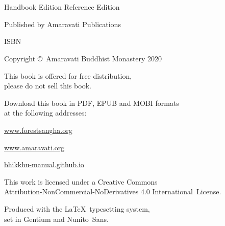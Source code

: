 \cleartoverso
\thispagestyle{empty}

{%

\ifhandbookedition
\fontsize{9}{10}\selectfont
\else
\fontsize{9}{11}\selectfont
\fi
\centering
\setlength{\parindent}{0pt}%
\setlength{\parskip}{0.8\baselineskip}%

\thetitle\\
\thesubtitle\\
\ifhandbookedition
Handbook Edition
\else
Reference Edition
\fi

Published by Amaravati Publications

ISBN \theISBN

Copyright \copyright\ Amaravati Buddhist Monastery 2020

This book is offered for free distribution,\\
please do not sell this book.

Download this book in PDF, EPUB and MOBI formats\\
at the following addresses:

\href{https://forestsangha.org/}{www.forestsangha.org}

\href{https://www.amaravati.org/}{www.amaravati.org}

\href{https://bhikkhu-manual.github.io/}{bhikkhu-manual.github.io}

\vfill

{\footnotesize

This work is licensed under a Creative Commons\\
Attribution-NonCommercial-NoDerivatives 4.0 International~License.

Produced with the \LaTeX\ typesetting system,\\
set in Gentium and Nunito~Sans.

\theEditionInfo

}}
